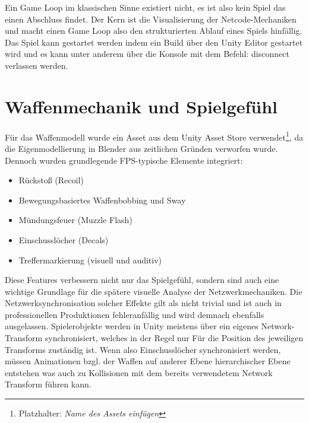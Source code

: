 Ein Game Loop im klassischen Sinne existiert nicht, es ist also kein Spiel das einen Abschluss findet. Der Kern ist die Visualisierung der Netcode-Mechaniken und macht einen Game Loop also den strukturierten Ablauf eines Spiels hinfällig. Das Spiel kann gestartet werden indem ein Build über den Unity Editor gestartet wird und es kann unter anderem über die Konsole mit dem Befehl: disconnect verlassen werden.
\section{Waffenmechanik und Spielgefühl}
\label{gamefeel}
Für das Waffenmodell wurde ein Asset aus dem Unity Asset Store verwendet\footnote{Platzhalter: \textit{Name des Assets einfügen}}, da die Eigenmodellierung in Blender aus zeitlichen Gründen verworfen wurde. Dennoch wurden grundlegende FPS-typische Elemente integriert:

\begin{itemize}
  \item Rückstoß (Recoil)
  \item Bewegungsbasiertes Waffenbobbing und Sway
  \item Mündungsfeuer (Muzzle Flash)
  \item Einschusslöcher (Decals)
  \item Treffermarkierung (visuell und auditiv)
\end{itemize}

Diese Features verbessern nicht nur das Spielgefühl, sondern sind auch eine wichtige Grundlage für die spätere visuelle Analyse der Netzwerkmechaniken. Die Netzwerksynchronisation solcher Effekte gilt als nicht trivial und ist auch in professionellen Produktionen fehleranfällig und wird demnach ebenfalls ausgelassen.
Spielerobjekte werden in Unity meistens über ein eigenes Network-Transform synchronisiert, welches in der Regel nur Für die Position des jeweiligen Transforms zuständig ist. Wenn also Einschusslöcher synchronisiert werden, müssen Animationen bzgl. der Waffen auf anderer Ebene hierarchischer Ebene entstehen was auch zu Kollisionen mit dem bereits verwendetem Network Transform führen kann.

